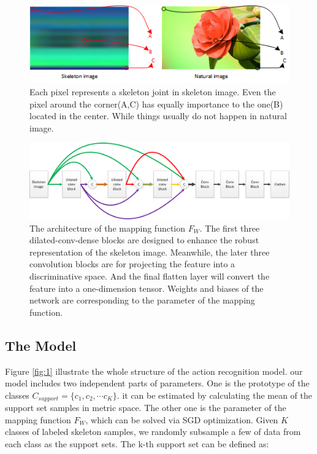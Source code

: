 \documentclass{bmvc2k}
\begin{document}
\begin{figure}[htb] 
	\centering
	\includegraphics[scale=0.8]{images/Figure_3.png}
	\caption{Each pixel represents a skeleton joint in skeleton image. Even the pixel around the corner(A,C) has equally importance to the one(B) located in the center. While things usually do not happen in natural image.}
	\label{fig:3}	
\end{figure}

\begin{figure}[htb] 
	\centering
	\includegraphics[scale=0.2]{images/Figure_4.png}
	\caption{The architecture of the mapping function $F_W$. The first three dilated-conv-dense blocks are designed to enhance the robust representation of the skeleton image. Meanwhile, the later three convolution blocks are for projecting the feature into a discriminative space. And the final flatten layer will convert the feature into a one-dimension tensor. Weights and biases of the network are corresponding to the parameter of the mapping function.}
	\label{fig:4}	
\end{figure}

\subsection*{The Model}
Figure \ref{fig:1} illustrate the whole structure of the action recognition model. our model includes two independent parts of parameters. One is the prototype of the classes $C_{support}=\{c_1,c_2,\cdots c_K\}$. it can be estimated by calculating the mean of the support set samples in metric space. The other one is the parameter of the mapping function $F_W$, which can be solved via SGD optimization. Given $K$ classes of labeled skeleton samples, we randomly subsample a few of data from each class as the support sets. The k-th support set can be defined as:
\end{document}
